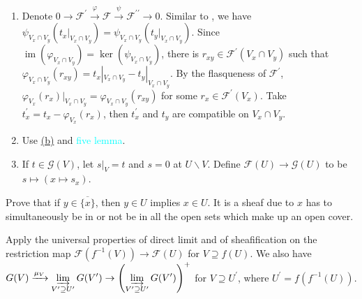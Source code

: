 \begin{exercise}\label{ex1.16}
	\begin{enumerate}[label=(\alph*),ref=\theexercise(\alph*)]
		\addtocounter{enumi}{1}
		\item\label{ex1.16.2} Denote $0\rightarrow\mathcal{F}^\prime\xrightarrow{\varphi}\mathcal{F}\xrightarrow{\psi}\mathcal{F}^{\prime\prime}\rightarrow0$. Similar to , we have $\psi_{V_x\cap V_y}\!\left(t_x|_{V_x\cap V_y}\right)=\psi_{V_x\cap V_y}\!\left(t_y|_{V_x\cap V_y}\right)$. Since $\operatorname{im}\!\left(\varphi_{V_x\cap V_y}\right)=\ker\!\left(\psi_{V_x\cap V_y}\right)$, there is $r_{xy}\in\mathcal{F}^\prime\!\left(V_x\cap V_y\right)$ such that $\varphi_{V_x\cap V_y}\!\left(r_{xy}\right)=t_x|_{V_x\cap V_y}-t_y|_{V_x\cap V_y}$. By the flasqueness of $\mathcal{F}^\prime$, $\varphi_{V_x}\!\left(r_x\right)|_{V_x\cap V_y}=\varphi_{V_x\cap V_y}\!\left(r_{xy}\right)$ for some $r_x\in\mathcal{F}^\prime\!\left(V_x\right)$. Take $t_x^\prime=t_x-\varphi_{V_x}\!\left(r_x\right)$, then $t_x^\prime$ and $t_y$ are compatible on $V_x\cap V_y$.
		\item\label{ex1.16.3} Use \hyperref[ex1.16.2]{(b)} and \textcolor{cyan}{five lemma}.
		\addtocounter{enumi}{1}
		\item\label{ex1.16.5} If $t\in\mathcal{G}(V)$, let $s|_V=t$ and $s=0$ at $U\backslash V$. Define $\mathcal{F}(U)\rightarrow\mathcal{G}(U)$ to be $s\mapsto\left(x\mapsto s_x\right)$.
	\end{enumerate}
\end{exercise}

\begin{exercise}\label{ex1.17}
	Prove that if $y\in\overline{\{x\}}$, then $y\in U$ implies $x\in U$. It is a sheaf due to $x$ has to simultaneously be in or not be in all the open sets which make up an open cover.
\end{exercise}

\begin{exercise}\label{ex1.18}
	Apply the universal properties of direct limit and of sheafification on the restriction map $\mathcal{F}\!\left(f^{-1}(V)\right)\rightarrow\mathcal{F}(U)$ for $V\supseteq f(U)$. We also have $\displaystyle G(V)\xrightarrow{\mu_V}\varinjlim_{V^\prime\supseteq U^\prime}G\!\left(V^\prime\right)\rightarrow\left(\varinjlim_{V^\prime\supseteq U^\prime}G\!\left(V^\prime\right)\right)^+$ for $V\supseteq U^\prime$, where $U^\prime=f\!\left(f^{-1}(U)\right)$.
\end{exercise}

